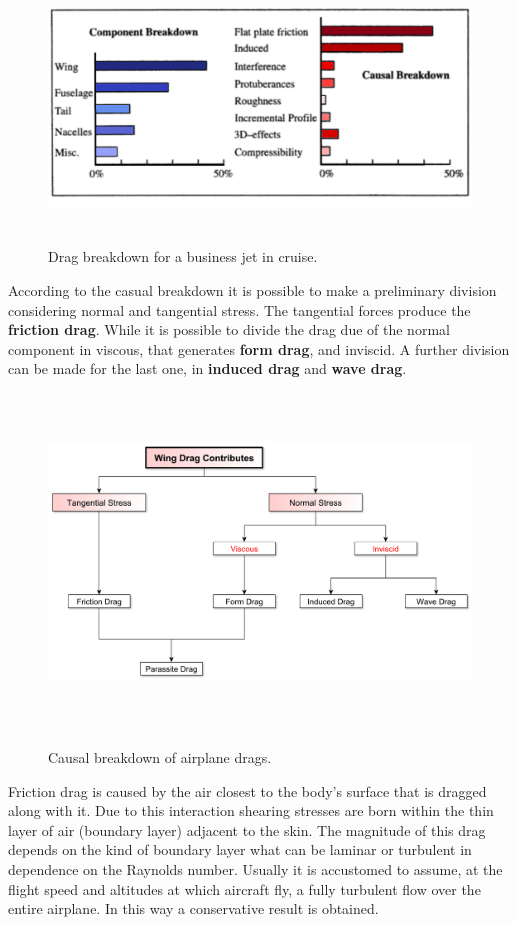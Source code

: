 \begin{figure}[H]
\centering
{\includegraphics[height=6.4cm]{Immagini/component.png}} 
\caption{Drag breakdown for a business jet in cruise.}
\end{figure}
According to the casual breakdown it is possible to make a preliminary division considering normal and tangential stress. The tangential forces produce the {\bfseries friction drag}. While it is possible to divide the drag due of the normal component in viscous, that generates {\bfseries form drag}, and inviscid. A further division can be made for the last one, in {\bfseries induced drag}  and {\bfseries wave drag}.\\
\begin{figure}[H]
\centering
{\includegraphics[height=8.9cm]{Immagini/dragcomponentlast.pdf}} 
\caption{Causal breakdown of airplane drags.}
\end{figure}
Friction drag is caused by the air closest to the body’s surface that is dragged along with it. Due to this interaction shearing stresses are born within the thin layer of air (boundary layer) adjacent to the skin. The magnitude of this drag depends on the kind of boundary layer what can be laminar or turbulent in dependence on the Raynolds number. Usually it is accustomed to assume, at the flight speed and altitudes at which aircraft fly, a fully turbulent flow over the entire airplane. In this way a conservative result is obtained.\\

